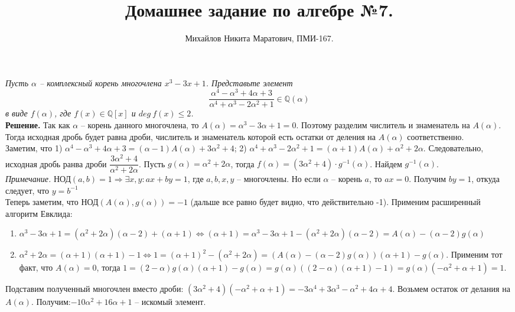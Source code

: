 \documentclass[a4paper, 12pt]{article}
\title{
     Домашнее задание по алгебре №7.
 }
\author{Михайлов Никита Маратович, ПМИ-167.
}
\date{}
\newcommand{\Q}{\mathbb{Q}}
\newcommand{\al}{\alpha}
\newcommand{\GCD}{\text{НОД}}
\begin{document}
\maketitle
\begin{spacing}{1}



\begin{center}
\end{center}

\noindent \textit{Пусть $\alpha$ -- комплексный корень многочлена $x^3-3x+1$. Представьте элемент
	$$
	\frac{\al^4 - \al^3+4\al+3}{\al^4+\al^3-2\al^2+1} \in \Q(\al)
	$$
	в виде $f(\al)$, где $f(x) \in \Q[x]$ и $deg\:f(x) \leq 2$.	
}\\
\noindent \textbf{Решение.} Так как $\al$ -- корень данного многочлена, то $A(\al) = \al^3-3\al+1 = 0$. Поэтому разделим числитель и знаменатель на $A(\al)$. Тогда исходная дробь будет равна дроби, числитель и знаменатель которой есть остатки от деления на $A(\al)$ соответственно. \\
Заметим, что 1) $\al^4 - \al^3+4\al+3 = (\al - 1)A(\al) + 3\al^2+4$; 2) $\al^4+\al^3-2\al^2+1 = (\al+1)A(\al) + \al^2+2\al$. Следовательно, исходная дробь ранва дроби $\dfrac{3\al^2+4}{\al^2+2\al}$. Пусть $g(\al)=\al^2+2\al$, тогда $f(\al) = (3\al^2+4) \cdot g^{-1}(\al)$. Найдем $g^{-1}(\al)$.\\
\textit{Примечание. } $\GCD(a,b) = 1 \Rightarrow \exists x,y: ax+by=1$, где $a, b, x, y$ -- многочлены. Но если $\al$ -- корень $a$, то $ax = 0$. Получим $by = 1$, откуда следует, что $y = b^{-1}$\\
Теперь заметим, что $\GCD(A(\al), g(\al)) = -1$ (дальше все равно будет видно, что действительно -1). Применим  расширенный алгоритм Евклида:
\begin{enumerate}
	\item $\al^3-3\al+1 = (\al^2+2\al)(\al-2) + (\al + 1) \Leftrightarrow (\al+1)=\al^3-3\al+1 - (\al^2+2\al)(\al-2) = A(\al)-(\al-2)g(\al)$
	\item $\al^2+2\al = (\al+1)(\al+1) - 1 \Leftrightarrow 1 = (\al+1)^2-(\al^2+2\al) = (A(\al)-(\al-2)g(\al))(\al+1) - g(\al)$. Применим тот факт, что $A(\al) = 0$, тогда $1 = (2-\al)g(\al)(\al + 1)- g(\al) = g(\al)((2-\al)(\al+1)-1) = g(\al)(-\al^2+\al+1) = 1$. 
\end{enumerate}
Подставим полученный многочлен вместо дроби: $(3\al^2+4)(-\al^2+\al+1) = -3\al^4+3\al^3-\al^2+4\al+4$. Возьмем остаток от делания на $A(\al)$. Получим:$-10\al^2+16\al+1$ -- искомый элемент.





\end{spacing}
\end{document}

